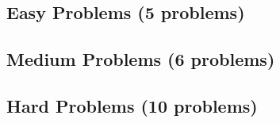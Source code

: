 \documentclass[12pt]{article}
\begin{document}
\vspace{1cm}

\subsection*{Easy Problems (5 problems)}


\newpage


\newpage


\newpage


\newpage


\newpage

\subsection*{Medium Problems (6 problems)}


\newpage


\newpage


\newpage


\newpage


\newpage


\newpage

\subsection*{Hard Problems (10 problems)}


\newpage


\newpage


\newpage


\newpage



\newpage



\newpage



\newpage



\newpage



\newpage


\end{document}
